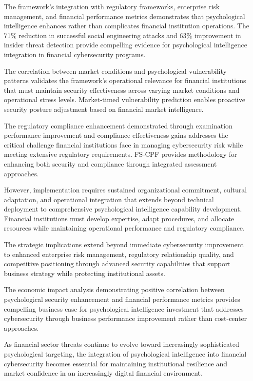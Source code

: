 \documentclass[10pt, twocolumn]{article}
\begin{document}
The framework's integration with regulatory frameworks, enterprise risk management, and financial performance metrics demonstrates that psychological intelligence enhances rather than complicates financial institution operations. The 71\% reduction in successful social engineering attacks and 63\% improvement in insider threat detection provide compelling evidence for psychological intelligence integration in financial cybersecurity programs.

The correlation between market conditions and psychological vulnerability patterns validates the framework's operational relevance for financial institutions that must maintain security effectiveness across varying market conditions and operational stress levels. Market-timed vulnerability prediction enables proactive security posture adjustment based on financial market intelligence.

The regulatory compliance enhancement demonstrated through examination performance improvement and compliance effectiveness gains addresses the critical challenge financial institutions face in managing cybersecurity risk while meeting extensive regulatory requirements. FS-CPF provides methodology for enhancing both security and compliance through integrated assessment approaches.

However, implementation requires sustained organizational commitment, cultural adaptation, and operational integration that extends beyond technical deployment to comprehensive psychological intelligence capability development. Financial institutions must develop expertise, adapt procedures, and allocate resources while maintaining operational performance and regulatory compliance.

The strategic implications extend beyond immediate cybersecurity improvement to enhanced enterprise risk management, regulatory relationship quality, and competitive positioning through advanced security capabilities that support business strategy while protecting institutional assets.

The economic impact analysis demonstrating positive correlation between psychological security enhancement and financial performance metrics provides compelling business case for psychological intelligence investment that addresses cybersecurity through business performance improvement rather than cost-center approaches.

As financial sector threats continue to evolve toward increasingly sophisticated psychological targeting, the integration of psychological intelligence into financial cybersecurity becomes essential for maintaining institutional resilience and market confidence in an increasingly digital financial environment.
\end{document}
